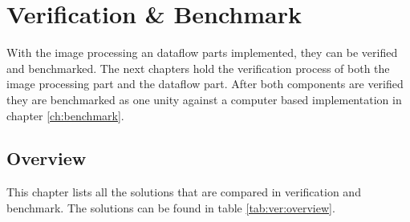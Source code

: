 %
%
\chapter{Verification \& Benchmark} \label{chapt:ver_bench}
With the image processing an dataflow parts implemented, they can be verified
and benchmarked. The next chapters hold the verification process of both the
image processing part and the dataflow part. After both components are verified
they are benchmarked as one unity against a computer based implementation in
chapter \ref{ch:benchmark}.

%
%
\section{Overview} \label{ch:overview}
This chapter lists all the solutions that are compared in verification and benchmark. The solutions can be found in table \ref{tab:ver:overview}.

